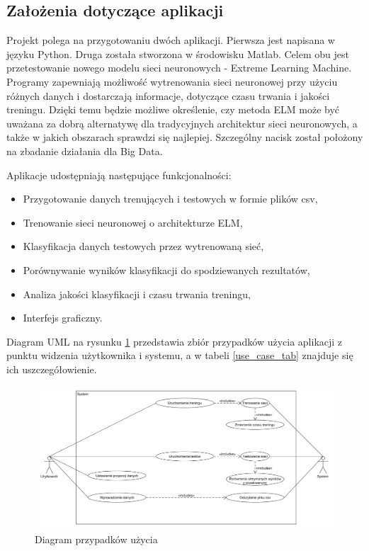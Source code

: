 \documentclass{article}
\begin{document}
\subsection{Założenia dotyczące aplikacji}
Projekt polega na przygotowaniu dwóch aplikacji. Pierwsza jest napisana w języku Python. Druga została stworzona w środowisku Matlab. Celem obu jest przetestowanie nowego modelu sieci neuronowych - Extreme Learning Machine. Programy zapewniają możliwość wytrenowania sieci neuronowej przy użyciu różnych danych i dostarczają informacje, dotyczące czasu trwania i jakości treningu. Dzięki temu będzie możliwe określenie, czy metoda ELM może być uważana za dobrą alternatywę dla tradycyjnych architektur sieci neuronowych, a także w jakich obszarach sprawdzi się najlepiej. Szczególny nacisk został położony na zbadanie działania dla Big Data.

Aplikacje udostępniają następujące funkcjonalności:
\begin{itemize}
\item Przygotowanie danych trenujących i testowych w formie plików csv,
\item Trenowanie sieci neuronowej o architekturze ELM,
\item Klasyfikacja danych testowych przez wytrenowaną sieć,
\item Porównywanie wyników klasyfikacji do spodziewanych rezultatów,
\item Analiza jakości klasyfikacji i  czasu trwania treningu,
\item Interfejs graficzny.
\end{itemize}
Diagram UML na rysunku \ref{use_case} przedstawia zbiór przypadków użycia aplikacji z punktu widzenia użytkownika i systemu, a w tabeli \ref{use_case_tab} znajduje się ich uszczegółowienie.
\begin{figure}[H]
\includegraphics[width=\textwidth]{use_case.png}
\caption{Diagram przypadków użycia}
\label{use_case}
\end{figure}
\end{document}
